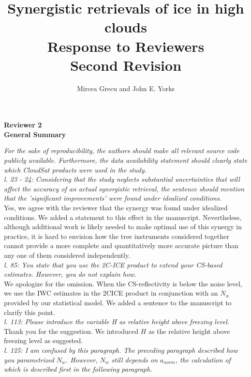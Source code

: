 \documentclass[12pt]{article}
\author{Mircea Grecu and John E. Yorks}
\title{Synergistic retrievals of ice in high clouds\\
Response to Reviewers\\Second Revision}
\date{}
\begin{document}
\maketitle


\noindent \textbf{Reviewer 2}\\
\noindent \textbf{General Summary}

\noindent\textit{ 
For the sake of reproducibility, the authors should make all relevant source code publicly available. Furthermore, the data availability statement should clearly state which CloudSat products were used in the study.}\\

\noindent\textit{l. 23 - 24: Considering that the study neglects substantial uncertainties that will affect the accuracy of an actual synergistic retrieval, the sentence should mention that the 'significant improvements' were found under idealized conditions.}\\

\noindent Yes, we agree with the reviewer that the synergy was found under idealized conditions. We added a statement to this effect in the manuscript. Nevertheless, although additional work is likely needed to make optimal use of this synergy in practice, it is hard to envision how the tree instruments considered together cannot provide a more complete and quantitatively more accurate picture than any one of them considered independently.\\

\noindent\textit{l. 85: You state that you use the 2C-ICE product to extend your CS-based estimates. However, you do not explain how.} \\

\noindent We apologize for the omission. When the CS-reflectivity is below the noise level, we use the IWC estimates in the 2C\-ICE product in conjunction with an $N_w$ provided by our statistical model. We added a sentence to the manuscript to clarify this point.\\

\noindent\textit{l. 113: Please introduce the variable H as relative height above freezing level.}\\

\noindent Thank you for the suggestion. We introduced $H$ as the relative height above freezing level as suggested.\\

\noindent\textit{l. 125: I am confused by this paragraph. The preceding paragraph described how you parametrized $N_w$. However, $N_w$ still depends on $a_{norm}$, the calculation of which is described first in the following paragraph.}\\
\end{document}
